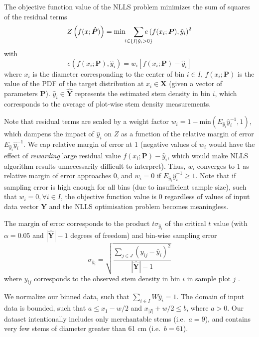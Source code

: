 \documentclass{article}
\begin{document}
The objective function value of the NLLS problem minimizes the sum of squares of the residual terms
\begin{equation}
Z\left(f(x; \bm{\hat{P}})\right) = \text{min} \quad \sum_{\mathclap{i \in \{I|\hat{y}_i > 0\}}} e\left(f(x_i; \bm{P}), \hat{y}_i\right)^2 \label{eq:z}
\end{equation}
with
\begin{equation}
e\left(f(x_i; \bm{P}), \hat{y}_i\right) = w_i \left[f(x_i; \bm{P}) - \hat{y}_i\right] 
\end{equation}
where $x_i$ is the diameter corresponding to the center of bin $i \in I$, $f(x_i; \bm{P})$ is the value of the PDF of the target distribution at $x_i \in \bm{X}$ (given a vector of parameters $\bm{P}$). $\hat{y}_i \in \bm{\hat{Y}}$ represents the estimated stem density in bin $i$, which corresponds to the average of plot-wise stem density measurements.

Note that residual terms are scaled by a weight factor $w_i = 1 - \text{min}(E_{\hat{y}_i}\hat{y}_i^{-1}, 1)$, which dampens the impact of $\hat{y}_i$ on $Z$ as a function of the relative margin of error $E_{\hat{y}_i}\hat{y}_i^{-1}$. We cap relative margin of error at 1 (negative values of $w_i$ would have the effect of \emph{rewarding} large residual value $f(x_i; \bm{P}) - \hat{y}_i$, which would make NLLS algorithm results unnecessarily difficult to interpret).  
Thus, $w_i$ converges to 1 as relative margin of error approaches 0, and $w_i = 0$ if $E_{\hat{y}_i}\hat{y}_i^{-1} \geq 1$. 
Note that if sampling error is high enough for all bins (due to insufficient sample size), such that  $w_i = 0, \forall i \in I$, the objective function value is 0 regardless of values of input data vector $\bm{\hat{Y}}$ and the NLLS optimisation problem becomes meaningless.

The margin of error corresponds to the product $t\sigma_{\hat{y}_i}$ of the critical $t$ value (with $\alpha=0.05$ and $|\bm{\hat{Y}}|  - 1$ degrees of freedom) and bin-wise sampling error
\begin{equation}
\sigma_{\hat{y}_i}  = \sqrt{\frac{\sum_{j \in J} \left(y_{ij} - \hat{y}_i\right)^2}{|\bm{\hat{Y}}| - 1}}
\end{equation}
where $y_{ij}$ corresponds to the observed stem density in bin $i$ in sample plot $j$ \citep{schreuder2004statistical}.


We normalize our binned data, such that $\sum_{i \in I} W\hat{y}_i = 1$.
The domain of input data is bounded, such that $a \leq x_1 - w/2$ and $x_{|I|} + w/2 \leq b$, where $a > 0$.
Our dataset intentionally includes only merchantable stems (i.e.~$a =9$), and contains very few stems of diameter greater than 61 cm (i.e.~$b = 61$).
\end{document}
